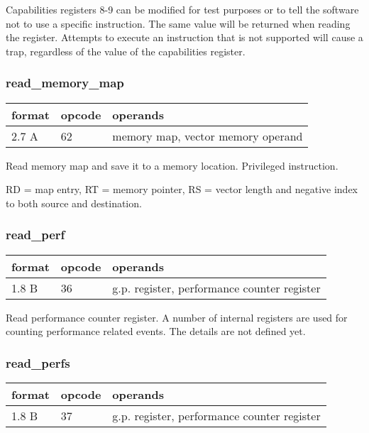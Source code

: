\documentclass[forwardcom.tex]{subfiles}
\begin{document}
Capabilities registers 8-9 can be modified for test purposes or to tell the software not to use a specific instruction. The same value will be returned when reading the register. Attempts to execute an instruction that is not supported will cause a trap, regardless of the value of the capabilities register.

\subsubsection{read\_memory\_map}
\label{table:readMemoryMapInstruction}
\begin{tabular}{|p{12mm}|p{12mm}|p{110mm}|}
\hline
\bfseries format & \bfseries opcode & \bfseries operands \\ \hline
2.7 A & 62 & memory map, vector memory operand \\ \hline
\end{tabular}
\vspace{2mm}

Read memory map and save it to a memory location. Privileged instruction.
\vspace{2mm}

RD = map entry, RT = memory pointer, RS = vector length and
negative index to both source and destination.

\subsubsection{read\_perf}
\label{table:readPerfInstruction}
\begin{tabular}{|p{12mm}|p{12mm}|p{110mm}|}
\hline
\bfseries format & \bfseries opcode & \bfseries operands \\ \hline
1.8 B & 36 & g.p. register, performance counter register \\ \hline
\end{tabular}
\vspace{2mm}

Read performance counter register. A number of internal registers are used for counting performance related events. The details are not defined yet.

\subsubsection{read\_perfs}
\label{table:readPerfInstruction}
\begin{tabular}{|p{12mm}|p{12mm}|p{110mm}|}
\hline
\bfseries format & \bfseries opcode & \bfseries operands \\ \hline
1.8 B & 37 & g.p. register, performance counter register \\ \hline
\end{tabular}
\vspace{2mm}
\end{document}
